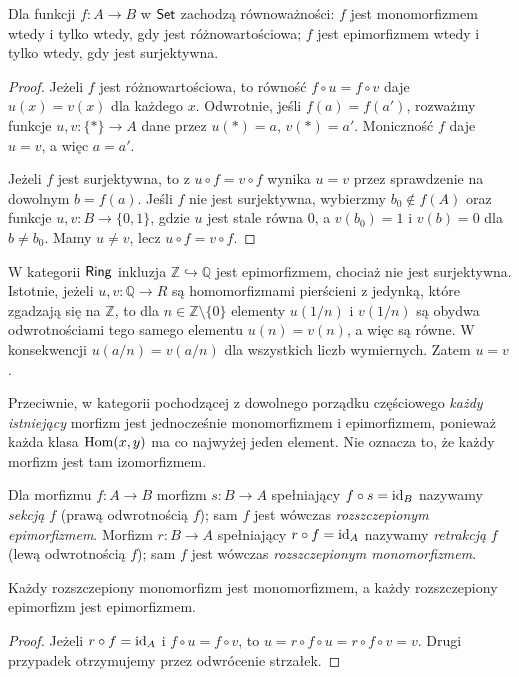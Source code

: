 \begin{twierdzenie}\label{tw:set-mono-epi}
Dla funkcji $f:A\to B$ w $\mathsf{Set}$ zachodzą równoważności: $f$ jest monomorfizmem wtedy i tylko wtedy, gdy jest różnowartościowa; $f$ jest epimorfizmem wtedy i tylko wtedy, gdy jest surjektywna.
\end{twierdzenie}
\begin{proof}
Jeżeli $f$ jest różnowartościowa, to równość $f\circ u=f\circ v$ daje $u(x)=v(x)$ dla każdego $x$. Odwrotnie, jeśli $f(a)=f(a')$, rozważmy funkcje $u,v:\{*\}\to A$ dane przez $u(*)=a$, $v(*)=a'$. Moniczność $f$ daje $u=v$, a więc $a=a'$.

Jeżeli $f$ jest surjektywna, to z $u\circ f=v\circ f$ wynika $u=v$ przez sprawdzenie na dowolnym $b=f(a)$. Jeśli $f$ nie jest surjektywna, wybierzmy $b_0\notin f(A)$ oraz funkcje $u,v:B\to\{0,1\}$, gdzie $u$ jest stale równa $0$, a $v(b_0)=1$ i $v(b)=0$ dla $b\neq b_0$. Mamy $u\neq v$, lecz $u\circ f=v\circ f$.
\end{proof}

\begin{przyklad}\label{przyklad:epi-pierscienie}
W kategorii $\mathsf{Ring}$ inkluzja $\mathbb Z\hookrightarrow\mathbb Q$ jest epimorfizmem, chociaż nie jest surjektywna. Istotnie, jeżeli $u,v:\mathbb Q\to R$ są homomorfizmami pierścieni z jedynką, które zgadzają się na $\mathbb Z$, to dla $n\in\mathbb Z\setminus\{0\}$ elementy $u(1/n)$ i $v(1/n)$ są obydwa odwrotnościami tego samego elementu $u(n)=v(n)$, a więc są równe. W konsekwencji $u(a/n)=v(a/n)$ dla wszystkich liczb wymiernych. Zatem $u=v$.

Przeciwnie, w kategorii pochodzącej z dowolnego porządku częściowego \emph{każdy istniejący} morfizm jest jednocześnie monomorfizmem i epimorfizmem, ponieważ każda klasa $\operatorname{Hom}(x,y)$ ma co najwyżej jeden element. Nie oznacza to, że każdy morfizm jest tam izomorfizmem.
\end{przyklad}

\begin{definicja}
Dla morfizmu $f:A\to B$ morfizm $s:B\to A$ spełniający $f\circ s=\mathrm{id}_B$ nazywamy \emph{sekcją} $f$ (prawą odwrotnością $f$); sam $f$ jest wówczas \emph{rozszczepionym epimorfizmem}. Morfizm $r:B\to A$ spełniający $r\circ f=\mathrm{id}_A$ nazywamy \emph{retrakcją} $f$ (lewą odwrotnością $f$); sam $f$ jest wówczas \emph{rozszczepionym monomorfizmem}.
\end{definicja}

\begin{stwierdzenie}
Każdy rozszczepiony monomorfizm jest monomorfizmem, a każdy rozszczepiony epimorfizm jest epimorfizmem.
\end{stwierdzenie}
\begin{proof}
Jeżeli $r\circ f=\mathrm{id}_A$ i $f\circ u=f\circ v$, to $u=r\circ f\circ u=r\circ f\circ v=v$. Drugi przypadek otrzymujemy przez odwrócenie strzałek.
\end{proof}

